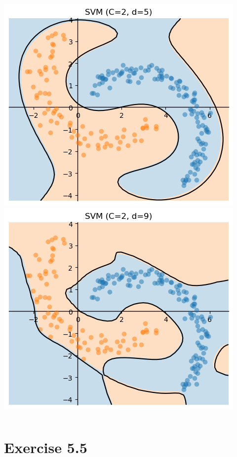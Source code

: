 \documentclass[10pt,aspectratio=169,handout]{beamer}
\begin{document}
\begin{frame}
\begin{columns}
\begin{column}{0.3\textwidth}
            \includegraphics[height=0.4\textheight]{images/task5-4-d_5.png}
            \includegraphics[height=0.4\textheight]{images/task5-4-d_9.png}
        \end{column}
        \end{columns}        
\end{frame}


\section{Exercise 5.5}
\end{document}
